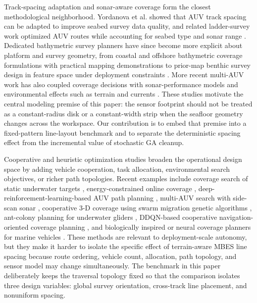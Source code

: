 \documentclass[jmse,article,submit,moreauthors]{Definitions/mdpi}
\begin{document}
Track-spacing adaptation and sonar-aware coverage form the closest methodological neighborhood. Yordanova et al. \cite{yordanova2020coverage} showed that AUV track spacing can be adapted to improve seabed survey data quality, and related ladder-survey work optimized AUV routes while accounting for seabed type and sonar range \cite{jiang2018route}. Dedicated bathymetric survey planners have since become more explicit about platform and survey geometry, from coastal and offshore bathymetric coverage formulations with practical mapping demonstrations \cite{zhao2024coastalcpp,zhao2024jointcpp} to prior-map benthic survey design in feature space under deployment constraints \cite{shields2023feature}. More recent multi-AUV work has also coupled coverage decisions with sonar-performance models and environmental effects such as terrain and currents \cite{mu2025coverage}. These studies motivate the central modeling premise of this paper: the sensor footprint should not be treated as a constant-radius disk or a constant-width strip when the seafloor geometry changes across the workspace. Our contribution is to embed that premise into a fixed-pattern line-layout benchmark and to separate the deterministic spacing effect from the incremental value of stochastic GA cleanup.

Cooperative and heuristic optimization studies broaden the operational design space by adding vehicle cooperation, task allocation, environmental search objectives, or richer path topologies. Recent examples include coverage search of static underwater targets \cite{yao2021coverage}, energy-constrained online coverage \cite{dogru2022ecocpp}, deep-reinforcement-learning-based AUV path planning \cite{hadi2022drlcpp}, multi-AUV search with side-scan sonar \cite{li2024multi}, cooperative 3-D coverage using swarm migration genetic algorithms \cite{xie2024three}, ant-colony planning for underwater gliders \cite{ji2022multi}, DDQN-based cooperative navigation-oriented coverage planning \cite{wang2025ddqn}, and biologically inspired or neural coverage planners for marine vehicles \cite{zhu2019complete,han2023hybrid,tang2023coverage}. These methods are relevant to deployment-scale autonomy, but they make it harder to isolate the specific effect of terrain-aware MBES line spacing because route ordering, vehicle count, allocation, path topology, and sensor model may change simultaneously. The benchmark in this paper deliberately keeps the traversal topology fixed so that the comparison isolates three design variables: global survey orientation, cross-track line placement, and nonuniform spacing.
\end{document}
